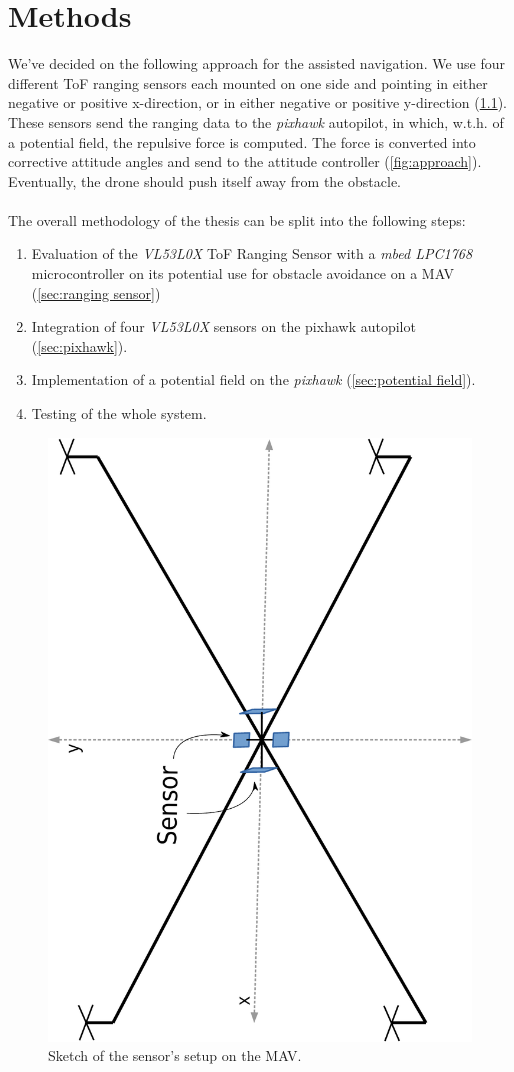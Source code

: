 \chapter{Methods}
\label{ch:methods}
We've decided on the following approach for the assisted navigation. We use four different ToF ranging sensors each mounted on one side and pointing in either negative or positive x-direction, or in either negative or positive y-direction (\cref{fig:sketch}). These sensors send the ranging data to the \textit{pixhawk} autopilot, in which, w.t.h. of a potential field, the repulsive force is computed. The force is converted into corrective attitude angles and send to the attitude controller (\cref{fig:approach}). Eventually, the drone should push itself away from the obstacle.\\\\

The overall methodology of the thesis can be split into the following steps:
\begin{enumerate}
	\item Evaluation of the \textit{VL53L0X} ToF Ranging Sensor with a \textit{mbed LPC1768} microcontroller on its potential use for obstacle avoidance on a MAV (\cref{sec:ranging sensor})
	\item Integration of four \textit{VL53L0X} sensors on the pixhawk autopilot (\cref{sec:pixhawk}).
	\item Implementation of a potential field on the \textit{pixhawk} (\cref{sec:potential field}).
	\item Testing of the whole system. 
\end{enumerate}

\begin{figure}
	\centering
	\includegraphics[width=0.4\linewidth, angle = 270]{pictures/mav_sketch.pdf}
	\caption{Sketch of the sensor's setup on the MAV.}
	\label{fig:sketch}
\end{figure}

